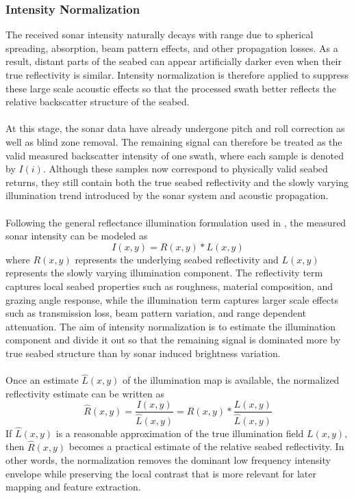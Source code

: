 \subsubsection{Intensity Normalization}
The received sonar intensity naturally decays with range due to spherical spreading, absorption, beam pattern effects, and other propagation losses. As a result, distant parts of the seabed can appear artificially darker even when their true reflectivity is similar. Intensity normalization is therefore applied to suppress these large scale acoustic effects so that the processed swath better reflects the relative backscatter structure of the seabed.
\\ \\
At this stage, the sonar data have already undergone pitch and roll correction as well as blind zone removal. The remaining signal can therefore be treated as the valid measured backscatter intensity of one swath, where each sample is denoted by $I(i)$. Although these samples now correspond to physically valid seabed returns, they still contain both the true seabed reflectivity and the slowly varying illumination trend introduced by the sonar system and acoustic propagation.
\\ \\
Following the general reflectance illumination formulation used in \cite{side_scan_sonar_master_thesis}, the measured sonar intensity can be modeled as
$$
    I(x, y) = R(x, y) \ast L(x, y)
$$
where $R(x,y)$ represents the underlying seabed reflectivity and $L(x,y)$ represents the slowly varying illumination component. The reflectivity term captures local seabed properties such as roughness, material composition, and grazing angle response, while the illumination term captures larger scale effects such as transmission loss, beam pattern variation, and range dependent attenuation. The aim of intensity normalization is to estimate the illumination component and divide it out so that the remaining signal is dominated more by true seabed structure than by sonar induced brightness variation.
\\ \\
Once an estimate $\hat{L}(x,y)$ of the illumination map is available, the normalized reflectivity estimate can be written as
$$
    \hat{R}(x, y) = \frac{I(x, y)}{\hat{L}(x, y)} = R(x, y) \ast \frac{L(x, y)}{\hat{L}(x, y)}
$$
If $\hat{L}(x,y)$ is a reasonable approximation of the true illumination field $L(x,y)$, then $\hat{R}(x,y)$ becomes a practical estimate of the relative seabed reflectivity. In other words, the normalization removes the dominant low frequency intensity envelope while preserving the local contrast that is more relevant for later mapping and feature extraction.
